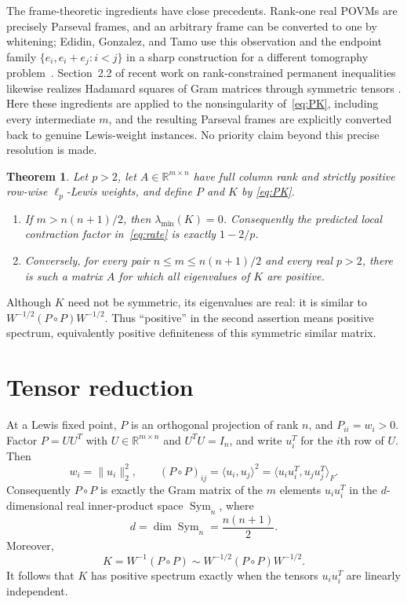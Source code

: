 \documentclass[11pt]{article}
\newtheorem{theorem}{Theorem}
\newcommand{\R}{\mathbb{R}}
\newcommand{\Sym}{\operatorname{Sym}}
\begin{document}
The frame-theoretic ingredients have close precedents.  Rank-one real POVMs
are precisely Parseval frames, and an arbitrary frame can be converted to one
by whitening; Edidin, Gonzalez, and Tamo use this observation and the endpoint
family $\{e_i,e_i+e_j:i<j\}$ in a sharp construction for a different
tomography problem~\cite[Sections~2.2, 2.5, and~3.2]{EdidinGonzalezTamo2025}.
Section~2.2 of recent work on rank-constrained permanent inequalities likewise
realizes Hadamard squares of Gram matrices through symmetric tensors
\cite{ZengLiuRatnavelu2026}.  Here these ingredients are applied
to the nonsingularity of~\eqref{eq:PK}, including every intermediate $m$, and
the resulting Parseval frames are explicitly converted back to genuine
Lewis-weight instances.  No priority claim beyond this precise resolution is
made.

\begin{theorem}\label{thm:main}
Let $p>2$, let $A\in\R^{m\times n}$ have full column rank and strictly
positive row-wise $\ell_p$-Lewis weights, and define $P$ and $K$ by
\eqref{eq:PK}.
\begin{enumerate}
\item If $m>n(n+1)/2$, then $\lambda_{\min}(K)=0$.  Consequently the
predicted local contraction factor in~\eqref{eq:rate} is exactly $1-2/p$.
\item Conversely, for every pair $n\leq m\leq n(n+1)/2$ and every real
$p>2$, there is such a matrix $A$ for which all eigenvalues of $K$ are
positive.
\end{enumerate}
\end{theorem}

Although $K$ need not be symmetric, its eigenvalues are real: it is similar
to $W^{-1/2}(P\circ P)W^{-1/2}$.  Thus ``positive'' in the second assertion
means positive spectrum, equivalently positive definiteness of this symmetric
similar matrix.

\section{Tensor reduction}

At a Lewis fixed point, $P$ is an orthogonal projection of rank $n$, and
$P_{ii}=w_i>0$.  Factor $P=UU^T$ with $U\in\R^{m\times n}$ and
$U^TU=I_n$, and write $u_i^T$ for the $i$th row of $U$.  Then
\begin{equation}\label{eq:gram}
 w_i=\lVert u_i\rVert_2^2,
 \qquad
 (P\circ P)_{ij}=\langle u_i,u_j\rangle^2
 =\langle u_i u_i^T,u_j u_j^T\rangle_F.
\end{equation}
Consequently $P\circ P$ is exactly the Gram matrix of the $m$ elements
$u_i u_i^T$ in the $d$-dimensional real inner-product space $\Sym_n$, where
\[
 d=\dim\Sym_n=\frac{n(n+1)}{2}.
\]
Moreover,
\begin{equation}\label{eq:similar}
 K=W^{-1}(P\circ P)
 \sim W^{-1/2}(P\circ P)W^{-1/2}.
\end{equation}
It follows that $K$ has positive spectrum exactly when the tensors
$u_i u_i^T$ are linearly independent.
\end{document}
